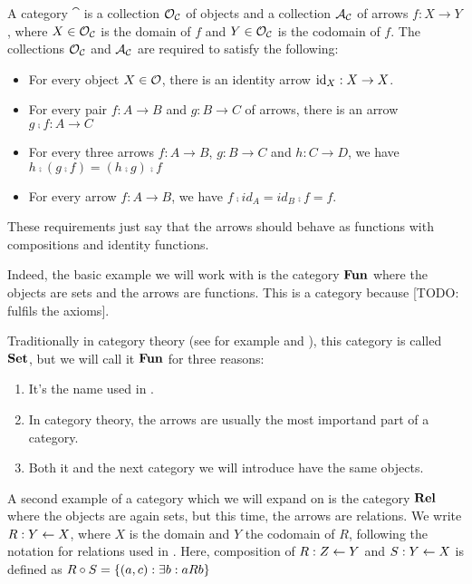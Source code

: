 \documentclass{article}
\begin{document}
\begin{Def}
A category $\cat$ is a collection $\mathcal{O}_{\mathcal{C}}$ of objects and a collection $\mathcal{A}_{\mathcal{C}}$ of arrows $f : X \to Y$, where $X \in \mathcal{O}_{\mathcal{C}}$ is the domain of $f$ and $Y \in \mathcal{O}_{\mathcal{C}}$ is the codomain of $f$. 
The collections $\mathcal{O}_{\mathcal{C}}$ and $\mathcal{A}_{\mathcal{C}}$ are required to satisfy the following:
\begin{itemize}
\item For every object $X \in \mathcal{O}$, there is an identity arrow $\operatorname{id}_X : X \to X$.
\item For every pair $f : A \to B$ and $g : B \to C$ of arrows, there is an arrow $g \comp f : A \to C$
\item For every three arrows $f : A \to B$, $g : B \to C$ and $h : C \to D$, we have $h \comp (g \comp f) = (h \comp g) \comp f$
\item For every arrow $f : A \to B$, we have $f \comp id_A = id_B \comp f = f$. 
\end{itemize}
\end{Def}

These requirements just say that the arrows should behave as functions with compositions and identity functions.

\begin{Ex}
Indeed, the basic example we will work with is the category $\mathbf{Fun}$ where the objects are sets and the arrows are functions. This is a category because [TODO: fulfils the axioms].
\end{Ex}

Traditionally in category theory (see for example \cite{Awodey} and \cite{MacLane}), this category is called $\mathbf{Set}$, but we will call it $\mathbf{Fun}$ for three reasons: 
\begin{enumerate}
\item It's the name used in \cite{AoP}.
\item In category theory, the arrows are usually the most importand part of a category.
\item Both it and the next category we will introduce have the same objects.
\end{enumerate}
\begin{Ex}
A second example of a category which we will expand on is the category $\mathbf{Rel}$ where the objects are again sets, but this time, the arrows are relations. 
We write $R : Y \leftarrow X$, where $X$ is the domain and $Y$ the codomain of $R$, following the notation for relations used in \cite{AoPA}. 
Here, composition of $R : Z \leftarrow Y$ and $S : Y \leftarrow X$ is defined as $R \circ S = \{(a, c) : \exists b : a R b \}$ 
\end{Ex}
\end{document}
